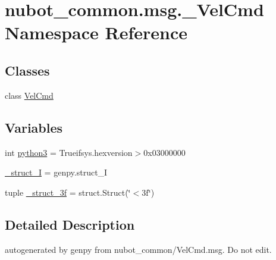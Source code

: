 \hypertarget{namespacenubot__common_1_1msg_1_1__VelCmd}{\section{nubot\-\_\-common.\-msg.\-\_\-\-Vel\-Cmd Namespace Reference}
\label{namespacenubot__common_1_1msg_1_1__VelCmd}
}
\subsection*{Classes}
\begin{DoxyCompactItemize}
\item 
class \hyperlink{classnubot__common_1_1msg_1_1__VelCmd_1_1VelCmd}{Vel\-Cmd}
\end{DoxyCompactItemize}
\subsection*{Variables}
\begin{DoxyCompactItemize}
\item 
int \hyperlink{namespacenubot__common_1_1msg_1_1__VelCmd_aa0b9b37915905ed527cc82b6a3a73eac}{python3} = Trueifsys.\-hexversion$>$0x03000000
\item 
\hyperlink{namespacenubot__common_1_1msg_1_1__VelCmd_ae6dd837722f842ce63a475878e949ff9}{\-\_\-struct\-\_\-\-I} = genpy.\-struct\-\_\-\-I
\item 
tuple \hyperlink{namespacenubot__common_1_1msg_1_1__VelCmd_a908ccffe79116a119d844ce4975148f8}{\-\_\-struct\-\_\-3f} = struct.\-Struct(\char`\"{}$<$3f\char`\"{})
\end{DoxyCompactItemize}


\subsection{Detailed Description}
\begin{DoxyVerb}autogenerated by genpy from nubot_common/VelCmd.msg. Do not edit.\end{DoxyVerb}
 

